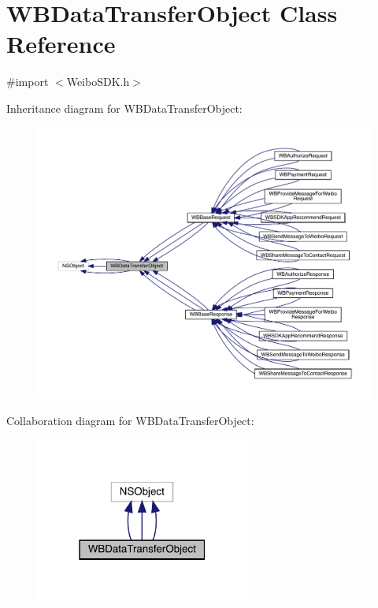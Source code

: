 \hypertarget{interface_w_b_data_transfer_object}{}\section{W\+B\+Data\+Transfer\+Object Class Reference}
\label{interface_w_b_data_transfer_object}


{\ttfamily \#import $<$Weibo\+S\+D\+K.\+h$>$}



Inheritance diagram for W\+B\+Data\+Transfer\+Object\+:\nopagebreak
\begin{figure}[H]
\begin{center}
\leavevmode
\includegraphics[width=350pt]{interface_w_b_data_transfer_object__inherit__graph}
\end{center}
\end{figure}


Collaboration diagram for W\+B\+Data\+Transfer\+Object\+:\nopagebreak
\begin{figure}[H]
\begin{center}
\leavevmode
\includegraphics[width=199pt]{interface_w_b_data_transfer_object__coll__graph}
\end{center}
\end{figure}
